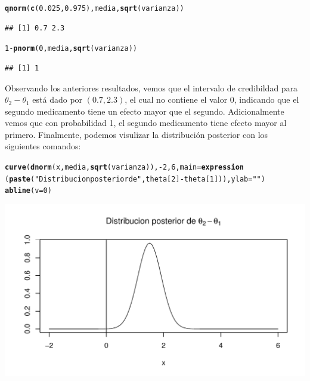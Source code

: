 \documentclass[10pt,openright]{book}\usepackage[]{graphicx}\usepackage[]{color}
\makeatletter
\def\maxwidth{ %
  \ifdim\Gin@nat@width>\linewidth
    \linewidth
  \else
    \Gin@nat@width
  \fi
}
\newcommand{\hlnum}[1]{\textcolor[rgb]{0.686,0.059,0.569}{#1}}%
\newcommand{\hlstr}[1]{\textcolor[rgb]{0.192,0.494,0.8}{#1}}%
\newcommand{\hlopt}[1]{\textcolor[rgb]{0,0,0}{#1}}%
\newcommand{\hlstd}[1]{\textcolor[rgb]{0.345,0.345,0.345}{#1}}%
\newcommand{\hlkwc}[1]{\textcolor[rgb]{0.333,0.667,0.333}{#1}}%
\newcommand{\hlkwd}[1]{\textcolor[rgb]{0.737,0.353,0.396}{\textbf{#1}}}%
\newenvironment{kframe}{%
 \def\at@end@of@kframe{}%
 \ifinner\ifhmode%
  \def\at@end@of@kframe{\end{minipage}}%
  \begin{minipage}{\columnwidth}%
 \fi\fi%
 \def\FrameCommand##1{\hskip\@totalleftmargin \hskip-\fboxsep
 \colorbox{shadecolor}{##1}\hskip-\fboxsep
     \hskip-\linewidth \hskip-\@totalleftmargin \hskip\columnwidth}%
 \MakeFramed {\advance\hsize-\width
   \@totalleftmargin\z@ \linewidth\hsize
   \@setminipage}}%
 {\par\unskip\endMakeFramed%
 \at@end@of@kframe}
\newenvironment{knitrout}{}{} %
\makeatother
\begin{document}
\begin{Eje}
\begin{knitrout}
\begin{kframe}
\begin{alltt}
\hlkwd{qnorm}\hlstd{(}\hlkwd{c}\hlstd{(}\hlnum{0.025}\hlstd{,}\hlnum{0.975}\hlstd{),media,}\hlkwd{sqrt}\hlstd{(varianza))}
\end{alltt}
\begin{verbatim}
## [1] 0.7 2.3
\end{verbatim}
\begin{alltt}
\hlnum{1}\hlopt{-}\hlkwd{pnorm}\hlstd{(}\hlnum{0}\hlstd{, media,} \hlkwd{sqrt}\hlstd{(varianza))}
\end{alltt}
\begin{verbatim}
## [1] 1
\end{verbatim}
\end{kframe}
\end{knitrout}
Observando los anteriores resultados, vemos que el intervalo de credibildad para $\theta_2-\theta_1$ est\'a dado por $(0.7, 2.3)$, el cual no contiene el valor 0, indicando que el segundo medicamento tiene un efecto mayor que el segundo. Adicionalmente vemos que con probabilidad 1, el segundo medicamento tiene efecto mayor al primero. Finalmente, podemos visulizar la distribuci\'on posterior con los siguientes comandos:
\begin{knitrout}
\color{fgcolor}\begin{kframe}
\begin{alltt}
\hlkwd{curve}\hlstd{(}\hlkwd{dnorm}\hlstd{(x, media,} \hlkwd{sqrt}\hlstd{(varianza)),} \hlopt{-}\hlnum{2}\hlstd{,} \hlnum{6}\hlstd{,} \hlkwc{main}\hlstd{=}\hlkwd{expression}
      \hlstd{(}\hlkwd{paste}\hlstd{(}\hlstr{"Distribucion posterior de "}\hlstd{, theta[}\hlnum{2}\hlstd{]} \hlopt{-} \hlstd{theta[}\hlnum{1}\hlstd{])),}\hlkwc{ylab}\hlstd{=}\hlstr{""}\hlstd{)}
\hlkwd{abline}\hlstd{(}\hlkwc{v}\hlstd{=}\hlnum{0}\hlstd{)}
\end{alltt}
\end{kframe}
\includegraphics[width=\maxwidth]{figure/unnamed-chunk-44-1} 


\end{knitrout}
\end{Eje}
\end{document}
